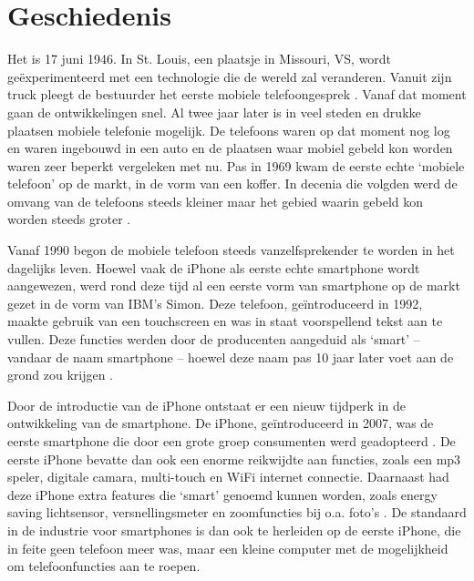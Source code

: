 \chapter{Geschiedenis}

Het is 17 juni 1946.
In St. Louis, een plaatsje in Missouri, VS, wordt ge\"experimenteerd met een technologie die de wereld zal veranderen.
Vanuit zijn truck pleegt de bestuurder het eerste mobiele telefoongesprek \citep{ATnT}.
Vanaf dat moment gaan de ontwikkelingen snel.
Al twee jaar later is in veel steden en drukke plaatsen mobiele telefonie mogelijk.
De telefoons waren op dat moment nog log en waren ingebouwd in een auto en de plaatsen waar mobiel gebeld kon worden waren zeer beperkt vergeleken met nu.
Pas in 1969 kwam de eerste echte `mobiele telefoon' op de markt, in de vorm van een koffer.
In decenia die volgden werd de omvang van de telefoons steeds kleiner maar het gebied waarin gebeld kon worden steeds groter \citep{Farley}.

Vanaf 1990 begon de mobiele telefoon steeds vanzelfsprekender te worden in het dagelijks leven.
Hoewel vaak de iPhone als eerste echte smartphone wordt aangewezen, werd rond deze tijd al een eerste vorm van smartphone op de markt gezet in de vorm van IBM's Simon.
Deze telefoon, ge\"introduceerd in 1992, maakte gebruik van een touchscreen en was in staat voorspellend tekst aan te vullen.
Deze functies werden door de producenten aangeduid als `smart' -- vandaar de naam smartphone -- hoewel deze naam pas 10 jaar later voet aan de grond zou krijgen \citep{BusinessWeek}.

Door de introductie van de iPhone ontstaat er een nieuw tijdperk in de ontwikkeling van de smartphone.
De iPhone, ge\"introduceerd in 2007, was de eerste smartphone die door een grote groep consumenten werd geadopteerd \citep{Hall}.
De eerste iPhone bevatte dan ook een enorme reikwijdte aan functies, zoals een mp3 speler, digitale camara, multi-touch en WiFi internet connectie.
Daarnaast had deze iPhone extra features die `smart' genoemd kunnen worden, zoals energy saving lichtsensor, versnellingsmeter en zoomfuncties bij o.a. foto's \citep{MacWorld}.
De standaard in de industrie voor smartphones is dan ook te herleiden op de eerste iPhone, die in feite geen telefoon meer was, maar een kleine computer met de mogelijkheid om telefoonfuncties aan te roepen.
